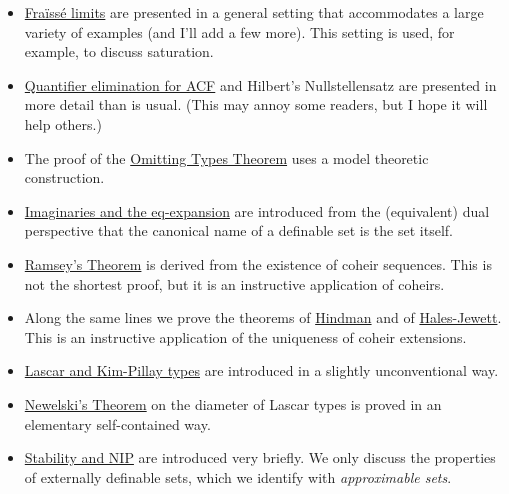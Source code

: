 \documentclass[creche.tex]{subfiles}
\begin{document}
\begin{itemize}
\item \hyperref[rich]{Fraïssé limits} are presented in a general setting that accommodates a large variety of examples (and I'll add a few more).
This setting is used, for example, to discuss saturation.
\item \hyperref[algebraic]{Quantifier elimination for ACF} and Hilbert's Nullstellensatz are presented in more detail than is usual.
(This may annoy some readers, but I hope it will help others.)
\item The proof of the \hyperref[countable]{Omitting Types Theorem} uses a model theoretic construction.
\item \hyperref[imaginary]{Imaginaries and the eq-expansion} are introduced from the (equivalent) dual perspective that the canonical name of a definable set is the set itself.
\item \hyperref[Ramsey]{Ramsey's Theorem} is derived from the existence of coheir sequences.
This is not the shortest proof, but it is an instructive application of coheirs.
\item Along the same lines we prove the theorems of \hyperref[Hindman]{Hindman} and of \hyperref[HJ]{Hales-Jewett}. This is an instructive application of the uniqueness of coheir extensions.
\item \hyperref[invariantL]{Lascar and Kim-Pillay types} are introduced in a slightly unconventional way.
\item \hyperref[newelski]{Newelski's Theorem\/} on the diameter of Lascar types is proved in an elementary self-contained way.
\item  \hyperref[external]{Stability and NIP\/} are introduced very briefly.
We only discuss the properties of externally definable sets, which we identify with \textit{approximable sets}.
\end{itemize}
\end{document}
